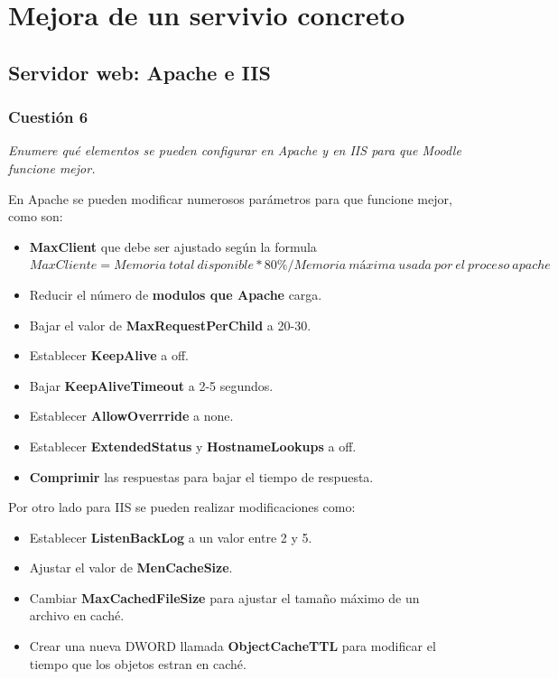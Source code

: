 \section{Mejora de un servivio concreto}
\subsection{Servidor web: Apache e IIS}
\subsubsection{Cuestión 6}
\textit{Enumere qué elementos se pueden configurar en Apache y en IIS para que Moodle funcione mejor.}

En Apache se pueden modificar numerosos parámetros para que funcione mejor, como son: \cite{moda}
\begin{itemize}
    \item \textbf{MaxClient }que debe ser ajustado según la formula $MaxCliente = Memoria\ total\ disponible * 80 \% / Memoria\ máxima\ usada\ por\ el\ proceso\ apache$
    \item Reducir el número de \textbf{modulos que Apache }carga.
    \item Bajar el valor de \textbf{MaxRequestPerChild} a 20-30.
    \item Establecer \textbf{KeepAlive} a off.
    \item Bajar \textbf{KeepAliveTimeout} a 2-5 segundos.
    \item Establecer \textbf{AllowOverrride} a none.
    \item Establecer \textbf{ExtendedStatus} y \textbf{HostnameLookups} a off.
    \item \textbf{Comprimir} las respuestas para bajar el tiempo de respuesta.
\end{itemize}

Por otro lado para IIS se pueden realizar modificaciones como: \cite{modi}
\begin{itemize}
    \item Establecer \textbf{ListenBackLog} a un valor entre 2 y 5.
    \item Ajustar el valor de \textbf{MenCacheSize}.
    \item Cambiar \textbf{MaxCachedFileSize }para ajustar el tamaño máximo de un archivo en caché.
    \item Crear una nueva DWORD llamada \textbf{ObjectCacheTTL} para modificar el tiempo que los objetos estran en caché.
\end{itemize}

